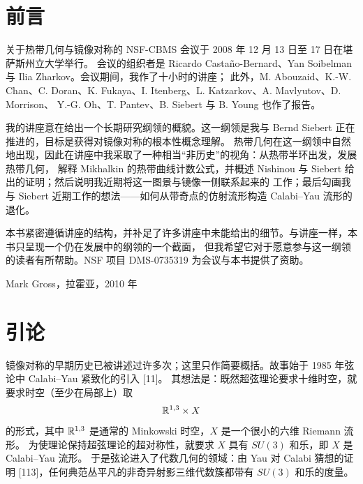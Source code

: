 \clearpage

\section*{前言}

关于热带几何与镜像对称的 NSF-CBMS 会议于 2008 年 12 月 13 日至 17 日在堪萨斯州立大学举行。
会议的组织者是 Ricardo Castaño-Bernard、Yan Soibelman 与 Ilia Zharkov。会议期间，我作了十小时的讲座；
此外，M. Abouzaid、K.-W. Chan、C. Doran、K. Fukaya、I. Itenberg、L. Katzarkov、A. Mavlyutov、D. Morrison、
Y.-G. Oh、T. Pantev、B. Siebert 与 B. Young 也作了报告。

我的讲座意在给出一个长期研究纲领的概貌。这一纲领是我与 Bernd Siebert 正在推进的，目标是获得对镜像对称的根本性概念理解。
热带几何在这一纲领中自然地出现，因此在讲座中我采取了一种相当“非历史”的视角：从热带半环出发，发展热带几何，
解释 Mikhalkin 的热带曲线计数公式，并概述 Nishinou 与 Siebert 给出的证明；然后说明我近期将这一图景与镜像一侧联系起来的
工作；最后勾画我与 Siebert 近期工作的想法——如何从带奇点的仿射流形构造 Calabi--Yau 流形的退化。

本书紧密遵循讲座的结构，并补足了许多讲座中未能给出的细节。与讲座一样，本书只呈现一个仍在发展中的纲领的一个截面，
但我希望它对于愿意参与这一纲领的读者有所帮助。NSF 项目 DMS-0735319 为会议与本书提供了资助。

\vspace{0.8em}
\noindent\hfill Mark Gross，拉霍亚，2010 年

\clearpage

\section*{引论}

镜像对称的早期历史已被讲述过许多次；这里只作简要概括。故事始于 1985 年弦论中 Calabi--Yau 紧致化的引入 [11]。
其想法是：既然超弦理论要求十维时空，就要求时空（至少在局部上）取
\[
  \mathbb{R}^{1,3}\times X
\]
的形式，其中 $\mathbb{R}^{1,3}$ 是通常的 Minkowski 时空，$X$ 是一个很小的六维 Riemann 流形。
为使理论保持超弦理论的超对称性，就要求 $X$ 具有 $SU(3)$ 和乐，即 $X$ 是 Calabi--Yau 流形。
于是弦论进入了代数几何的领域：由 Yau 对 Calabi 猜想的证明 [113]，任何典范丛平凡的非奇异射影三维代数簇都带有 $SU(3)$ 和乐的度量。

